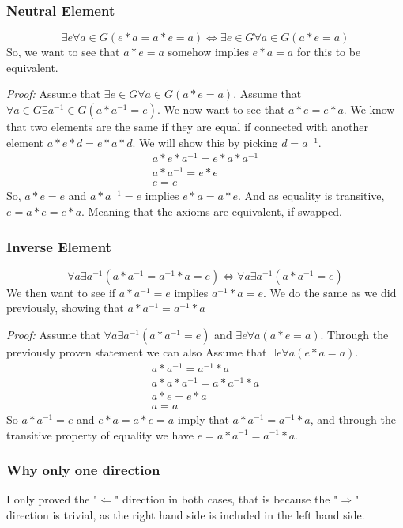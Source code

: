 \documentclass[]{scrartcl}
\begin{document}
\subsubsection{Neutral Element}
$$
\exists e\forall a\in G (e*a = a*e = a) \Leftrightarrow \exists e\in G \forall a\in G(a * e = a)
$$
So, we want to see that $a*e = a$ somehow implies $e*a = a$ for this to be equivalent.

\textit{Proof: } Assume that $\exists e\in G \forall a\in G(a*e = a)$. Assume that $\forall a\in G\exists a^{-1}\in G(a*a^{-1} =e)$. We now want to see that $a*e = e*a$. We know that two elements are the same if they are equal if connected with another element $a*e*d = e*a*d$. We will show this by picking $d = a^{-1}$.
\begin{gather}
	a*e*a^{-1} = e*a*a^{-1}\\
	a*a^{-1} = e*e\\
	e = e
\end{gather}
So, $a*e = e$ and $a*a^{-1}=e$ implies $e*a = a*e$. And as equality is transitive, $e = a * e = e* a$. Meaning that the axioms are equivalent, if swapped.

\subsubsection{Inverse Element}
$$
\forall a\exists a^{-1}(a*a^{-1} = a^{-1}*a = e) \Leftrightarrow \forall a\exists a^{-1}(a*a^{-1}=e)
$$
We then want to see if $a*a^{-1}=e$ implies $a^{-1}*a=e$. We do the same as we did previously, showing that $a * a^{-1} = a^{-1} * a$

\textit{Proof:} Assume that $\forall a\exists a^{-1}(a*a^{-1}=e)$ and $\exists e\forall a(a*e = a)$. Through the previously proven statement we can also Assume that $\exists e \forall a(e*a = a)$. 
\begin{gather}
	a * a^{-1} = a^{-1} * a\\
	a * a * a^{-1} = a * a^{-1} * a\\
	a * e = e * a\\
	a = a
\end{gather}
So $a*a^{-1} = e$ and $e*a = a*e = a$ imply that $a*a^{-1} = a^{-1}*a$, and through the transitive property of equality we have $e = a*a^{-1} = a^{-1}*a$.
\subsubsection{Why only one direction}
I only proved the "$\Leftarrow$" direction in both cases, that is because the "$\Rightarrow$" direction is trivial, as the right hand side is included in the left hand side.
\end{document}
